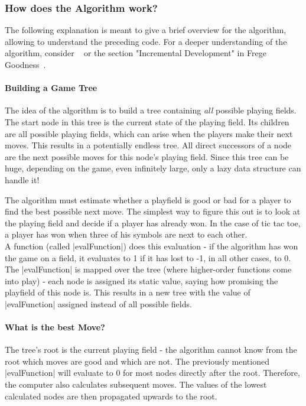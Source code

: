 \subsubsection{How does the Algorithm work?} %
\label{subsub:How does the Algorithm work?}
The following explanation is meant to give a brief overview for the
algorithm, allowing to understand the preceding code. For a deeper
understanding of the algorithm, consider ~\cite[Ch. 5]{hughes_why_1989} or the
section "Incremental Development" in Frege Goodness~\cite{frege_goodness}.

\paragraph{Building a Game Tree} The idea of the algorithm is to build a tree
containing \textit{all} possible playing fields. The start node in this
tree is the current state of the playing field. Its children are all possible
playing fields, which can arise when the players make their next moves. This
results in a potentially endless tree. All direct successors of a node are the
next possible moves for this node's playing field. Since this tree can be huge,
depending on the game, even infinitely large, only a lazy data structure can
handle it!

The algorithm must estimate whether a playfield is good or bad for a player to
find the best possible next move. The simplest way to figure this out is to
look at the playing field and decide if a player has already won. In the case
of tic tac toe, a player has won when three of his symbols are next to each
other. \\
A function (called |evalFunction|) does this evaluation - if the algorithm has
won the game on a field, it evaluates to 1 if it has lost to -1, in all other
cases, to 0.\\
The |evalFunction| is mapped over the tree (where higher-order functions come
into play) - each node is assigned its static value, saying how promising the
playfield of this node is. This results in a new tree with the value of
|evalFunction| assigned instead of all possible fields.\\

\paragraph{What is the best Move?}
The tree's root is the current playing field - the algorithm cannot know from
the root which moves are good and which are not. The previously mentioned
|evalFunction| will evaluate to 0 for most nodes directly after the root.
Therefore, the computer also calculates subsequent moves. The values of the
lowest calculated nodes are then propagated upwards to the root. 

